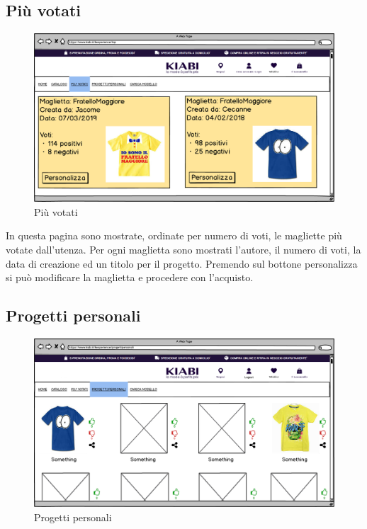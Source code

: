 \documentclass[12pt,italian,]{report}
\begin{document}
\hypertarget{piuxf9-votati}{%
\subsection{Più votati}\label{piuxf9-votati}}

\begin{figure}[h]
\centering
\includegraphics{img/balsamiq/MostRated.png}
\caption{Più votati}
\end{figure}

In questa pagina sono mostrate, ordinate per numero di voti, le
magliette più votate dall'utenza. Per ogni maglietta sono mostrati
l'autore, il numero di voti, la data di creazione ed un titolo per il
progetto. Premendo sul bottone personalizza si può modificare la
maglietta e procedere con l'acquisto.

\hypertarget{progetti-personali}{%
\subsection{Progetti personali}\label{progetti-personali}}

\begin{figure}[h]
\centering
\includegraphics{img/balsamiq/ProgettiPersonali.png}
\caption{Progetti personali}
\end{figure}
\end{document}

